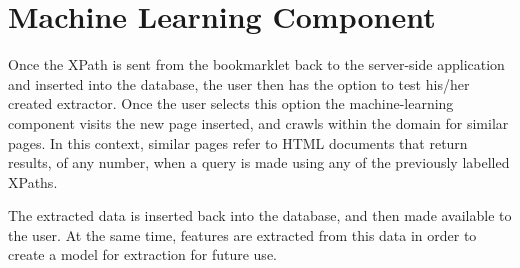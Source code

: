 \section{Machine Learning Component}
Once the XPath is sent from the bookmarklet back to the server-side application and inserted into the database, the user then has the option to test his/her created extractor. Once the user selects this option the machine-learning component visits the new page inserted, and crawls within the domain for similar pages. In this context, similar pages refer to HTML documents that return results, of any number, when a query is made using any of the previously labelled XPaths. 



	The extracted data is inserted back into the database, and then made available to the user. At the same time, features are extracted from this data in order to create a model for extraction for future use.
	
	